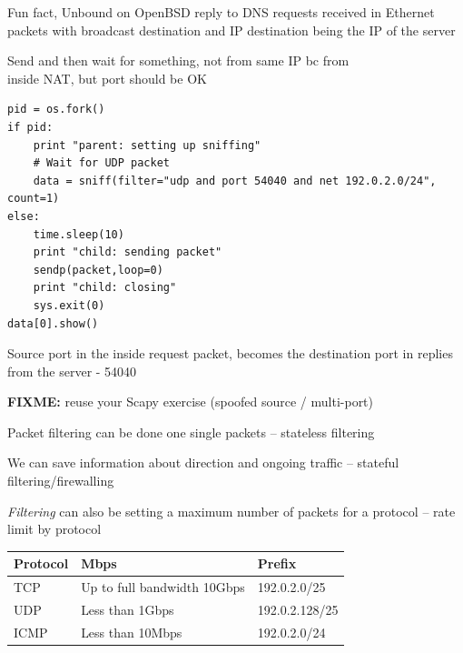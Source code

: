 \documentclass[Screen16to9,17pt]{foils}
\begin{document}
{\footnotesize Fun fact, Unbound on OpenBSD reply to DNS requests received in Ethernet packets with broadcast destination and IP destination being the IP of the server}


Send and then wait for something, not from same IP bc from\\
inside NAT, but port should be OK
\begin{verbatim}
pid = os.fork()
if pid:
    print "parent: setting up sniffing"
    # Wait for UDP packet
    data = sniff(filter="udp and port 54040 and net 192.0.2.0/24", count=1)
else:
    time.sleep(10)
    print "child: sending packet"
    sendp(packet,loop=0)
    print "child: closing"
    sys.exit(0)
data[0].show()
\end{verbatim}

Source port in the inside request packet, becomes the destination port in replies from the server - 54040

\begin{list2}
\item \textbf{FIXME:} reuse your Scapy exercise (spoofed source / multi-port)
\end{list2}



\begin{list2}
\item Packet filtering can be done one single packets -- stateless filtering
\item We can save information about direction and ongoing traffic -- stateful filtering/firewalling
\item \emph{Filtering} can also be setting a maximum number of packets for a protocol -- rate limit by protocol
\end{list2}


\begin{tabularx}{\textwidth-5cm}{|p{5cm}|p{7cm}|X|} \hline
{\bf Protocol} & {\bf Mbps} & {\bf Prefix}\\\hline
TCP & Up to full bandwidth 10Gbps & 192.0.2.0/25 \\\hline
UDP & Less than 1Gbps & 192.0.2.128/25 \\\hline
ICMP & Less than 10Mbps & 192.0.2.0/24 \\\hline
\end{tabularx}
\end{document}
